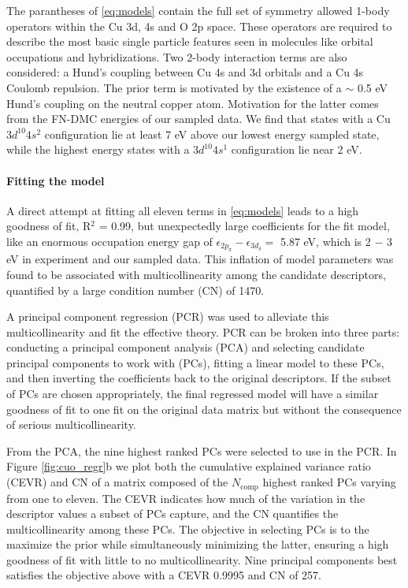 \documentclass[12pt]{article}
\begin{document}
The parantheses of \eqref{eq:models} contain the full set of symmetry allowed 1-body operators within the Cu 3d, 4s and O 2p space.
These operators are required to describe the most basic single particle features seen in molecules like orbital occupations and hybridizations.
Two 2-body interaction terms are also considered: a Hund's coupling between Cu 4s and 3d orbitals and a Cu 4s Coulomb repulsion.
The prior term is motivated by the existence of a $\sim $ 0.5 eV Hund's coupling on the neutral copper atom.
Motivation for the latter comes from the FN-DMC energies of our sampled data.
We find that states with a Cu $3d^{10} 4s^{2}$ configuration lie at least 7 eV above our lowest energy sampled state, while the highest energy states with a $3d^{10} 4s^{1}$ configuration lie near 2 eV.

\paragraph{Fitting the model}
A direct attempt at fitting all eleven terms in \eqref{eq:models} leads to a high goodness of fit, R$^2$ = 0.99, but unexpectedly large coefficients for the fit model, like an enormous occupation energy gap of $\epsilon_{2p_\pi} - \epsilon_{3d_\delta} = $ 5.87 eV, which is 2 $-$ 3 eV in experiment and our sampled data.
This inflation of model parameters was found to be associated with multicollinearity among the candidate descriptors, quantified by a large condition number (CN) of 1470.

A principal component regression (PCR) was used to alleviate this multicollinearity and fit the effective theory.
PCR can be broken into three parts: conducting a principal component analysis (PCA) and selecting candidate principal components to work with (PCs), fitting a linear model to these PCs, and then inverting the coefficients back to the original descriptors.
If the subset of PCs are chosen appropriately, the final regressed model will have a similar goodness of fit to one fit on the original data matrix but without the consequence of serious multicollinearity.

From the PCA, the nine highest ranked PCs were selected to use in the PCR.
In Figure \eqref{fig:cuo_regr}b we plot both the cumulative explained variance ratio (CEVR) and CN of a matrix composed of the $N_\text{comp}$ highest ranked PCs varying from one to eleven.
The CEVR indicates how much of the variation in the descriptor values a subset of PCs capture, and the CN quantifies the multicollinearity among these PCs.
The objective in selecting PCs is to the maximize the prior while simultaneously minimizing the latter, ensuring a high goodness of fit with little to no multicollinearity.
Nine principal components best satisfies the objective above with a CEVR 0.9995 and CN of 257.
\end{document}
